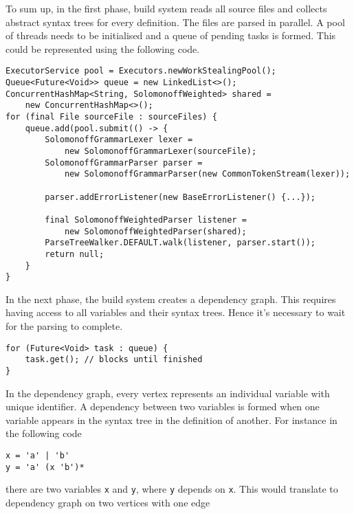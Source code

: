 To sum up, in the first phase, build system reads all source files and collects abstract syntax trees for every definition. The files are parsed in parallel. A pool of threads needs to be initialised and a queue of pending tasks is formed. This could be represented using the following code.
\begin{lstlisting}
ExecutorService pool = Executors.newWorkStealingPool();
Queue<Future<Void>> queue = new LinkedList<>();
ConcurrentHashMap<String, SolomonoffWeighted> shared = 
    new ConcurrentHashMap<>();
for (final File sourceFile : sourceFiles) {
    queue.add(pool.submit(() -> {
        SolomonoffGrammarLexer lexer =
            new SolomonoffGrammarLexer(sourceFile);
        SolomonoffGrammarParser parser =
            new SolomonoffGrammarParser(new CommonTokenStream(lexer));
        
        parser.addErrorListener(new BaseErrorListener() {...});
        
        final SolomonoffWeightedParser listener =
            new SolomonoffWeightedParser(shared);
        ParseTreeWalker.DEFAULT.walk(listener, parser.start());
        return null;
    }
}
\end{lstlisting}
In the next phase, the build system creates a dependency graph. This requires having access to all variables and their syntax trees. Hence it's necessary to wait for the parsing to complete.
\begin{lstlisting}
for (Future<Void> task : queue) {
    task.get(); // blocks until finished
}
\end{lstlisting}
In the dependency graph, every vertex represents an individual variable with
unique identifier. A dependency between two variables is formed when one variable appears in the syntax tree in the definition of another.
For instance in the following code
\begin{lstlisting}
x = 'a' | 'b'
y = 'a' (x 'b')*
\end{lstlisting}
there are two variables \texttt{x} and \texttt{y}, where \texttt{y} depends on \texttt{x}. This would translate to dependency graph on two vertices with one edge
\begin{center}
\end{center}
